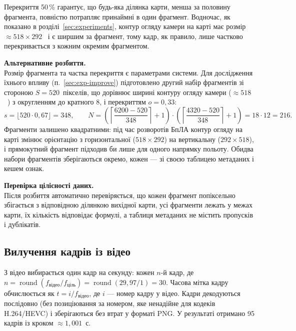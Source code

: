 \documentclass[a4paper, 12pt, titlepage]{article}
\begin{document}
Перекриття 50\,\% гарантує, що будь-яка ділянка карти, менша за половину фрагмента, повністю потрапляє принаймні в один фрагмент. Водночас, як показано в розділі~\ref{sec:experiments}, контур огляду камери на карті має розмір $\approx 518 \times 292$~\px{} і є ширшим за фрагмент, тому кадр, як правило, лише частково перекривається з кожним окремим фрагментом.

\textbf{Альтернативне розбиття.}\\
Розмір фрагмента та частка перекриття є параметрами системи. Для дослідження їхнього впливу (п.~\ref{sec:exp-improve}) підготовлено другий набір фрагментів зі стороною $S = 520$~пікселів, що дорівнює ширині контуру огляду камери ($\approx 518$~\px{}) з округленням до кратного 8, і перекриттям $o = 0{,}33$:
\begin{equation}
s = \lfloor 520 \cdot 0{,}67 \rfloor = 348, \qquad
N = \left( \left\lceil \frac{6200 - 520}{348} \right\rceil + 1 \right) \cdot \left( \left\lceil \frac{4320 - 520}{348} \right\rceil + 1 \right) = 18 \cdot 12 = 216 .
\end{equation}
Фрагменти залишено квадратними: під час розворотів БпЛА контур огляду на карті змінює орієнтацію з горизонтальної ($518 \times 292$) на вертикальну ($292 \times 518$), і прямокутний фрагмент підходив би лише для одного напрямку польоту. Обидва набори фрагментів зберігаються окремо, кожен --- зі своєю таблицею метаданих і кешем ознак.

\textbf{Перевірка цілісності даних.}\\
Після розбиття автоматично перевіряється, що кожен фрагмент попіксельно збігається з відповідною ділянкою вихідної карти, усі фрагменти лежать у межах карти, їх кількість відповідає формулі, а таблиця метаданих не містить пропусків і дублікатів.

\subsection{Вилучення кадрів із відео}

З відео вибирається один кадр на секунду: кожен $n$-й кадр, де $n = \operatorname{round}(f_{\text{відео}} / f_{\text{ціль}}) = \operatorname{round}(29{,}97 / 1) = 30$. Часова мітка кадру обчислюється як $t = i / f_{\text{відео}}$, де $i$ --- номер кадру у відео. Кадри декодуються послідовно (без позиціювання за номером, яке ненадійне для кодеків H.264/HEVC) і зберігаються без втрат у форматі PNG. У результаті отримано 95 кадрів із кроком $\approx 1{,}001$~с.
\end{document}
